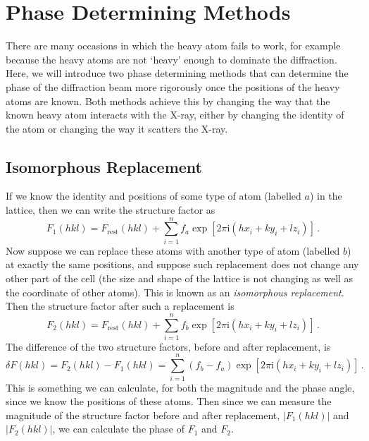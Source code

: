 \documentclass{article}
\theoremstyle{plain}\theoremheaderfont{\normalfont\itshape}\theorembodyfont{\rmfamily}\theoremseparator{.}\newtheorem*{rem}{Remark}\newtheorem*{ex}{Example}\newtheorem*{proof}{Proof}\newtheorem*{altp}{Alternative proof}
\theoremstyle{plain}\theoremheaderfont{\normalfont\bfseries}\theorembodyfont{\rmfamily}\theoremseparator{.}\newtheorem{thm}{Theorem}[section]\newtheorem{lem}[thm]{Lemma}\newtheorem{prop}[thm]{Proposition}\newtheorem*{cor}{Corollary}\newtheorem{defn}[thm]{Definition}\newtheorem{clm}[thm]{Claim}\newtheorem{clminproof}{Claim}\newtheorem*{law}{Law}\newtheorem{pos}[thm]{Postulate}
\theoremstyle{break}\theoremheaderfont{\normalfont\itshape}\theorembodyfont{\rmfamily}\theoremseparator{.\medskip}\newtheorem*{proofskip}{Proof}\newtheorem*{exs}{Examples}\newtheorem*{rems}{Remarks}
\theoremstyle{break}\theoremheaderfont{\normalfont\bfseries}\theorembodyfont{\rmfamily}\theoremseparator{.\medskip}\newtheorem{lemskip}[thm]{Lemma}\newtheorem{defnskip}[thm]{Definition}\newtheorem{propskip}[thm]{Proposition}\newtheorem{thmskip}[thm]{Theorem}
\numberwithin{equation}{section}
\newcommand{\ii}{\mathrm{i}}
\newcommand{\abs}[1]{\left| #1 \right|}
\begin{document}
    \section{Phase Determining Methods}
    There are many occasions in which the heavy atom fails to work, for example because the heavy atoms are not `heavy' enough to dominate the diffraction. Here, we will introduce two phase determining methods that can determine the phase of the diffraction beam more rigorously once the positions of the heavy atoms are known. Both methods achieve this by changing the way that the known heavy atom interacts with the X-ray, either by changing the identity of the atom or changing the way it scatters the X-ray.

    \subsection{Isomorphous Replacement}
    If we know the identity and positions of some type of atom (labelled \(a\)) in the lattice, then we can write the structure factor as
    \begin{equation}
        F_{1}(hkl)=F_{\text{rest}}(hkl)+\sum_{i=1}^{n}f_a\exp[2\pi \ii(hx_i+ky_i+lz_i)]\,.
    \end{equation}
    Now suppose we can replace these atoms with another type of atom (labelled \(b\)) at exactly the same positions, and suppose such replacement does not change any other part of the cell (the size and shape of the lattice is not changing as well as the coordinate of other atoms). This is known as an \textit{isomorphous replacement}. Then the structure factor after such a replacement is
    \begin{equation}
        F_{2}(hkl)=F_{\text{rest}}(hkl)+\sum_{i=1}^{n}f_b\exp[2\pi \ii(hx_i+ky_i+lz_i)]\,.
    \end{equation}
    The difference of the two structure factors, before and after replacement, is
    \begin{equation}
        \delta F(hkl)=F_{2}(hkl)-F_{1}(hkl)=\sum_{i=1}^{n}(f_b-f_a)\exp[2\pi \ii(hx_i+ky_i+lz_i)]\,.
    \end{equation}
    This is something we can calculate, for both the magnitude and the phase angle, since we know the positions of these atoms. Then since we can measure the magnitude of the structure factor before and after replacement, \(\abs{F_1(hkl)}\) and \(\abs{F_2(hkl)}\), we can calculate the phase of \(F_1\) and \(F_2\).
\end{document}
